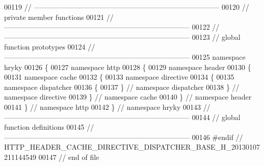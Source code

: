 \begin{DoxyCode}
00119 \textcolor{comment}{//
      ------------------------------------------------------------------------------}
00120 \textcolor{comment}{// private member functions}
00121 \textcolor{comment}{//
      ------------------------------------------------------------------------------}
00122 \textcolor{comment}{//
      ------------------------------------------------------------------------------}
00123 \textcolor{comment}{// global function prototypes}
00124 \textcolor{comment}{//
      ------------------------------------------------------------------------------}
00125 \textcolor{keyword}{namespace }hryky
00126 \{
00127 \textcolor{keyword}{namespace }http
00128 \{
00129 \textcolor{keyword}{namespace }header
00130 \{
00131 \textcolor{keyword}{namespace }cache
00132 \{
00133 \textcolor{keyword}{namespace }directive
00134 \{
00135 \textcolor{keyword}{namespace }dispatcher
00136 \{
00137 \} \textcolor{comment}{// namespace dispatcher}
00138 \} \textcolor{comment}{// namespace directive}
00139 \} \textcolor{comment}{// namespace cache}
00140 \} \textcolor{comment}{// namespace header}
00141 \} \textcolor{comment}{// namespace http}
00142 \} \textcolor{comment}{// namespace hryky}
00143 \textcolor{comment}{//
      ------------------------------------------------------------------------------}
00144 \textcolor{comment}{// global function definitions}
00145 \textcolor{comment}{//
      ------------------------------------------------------------------------------}
00146 \textcolor{preprocessor}{#endif // HTTP\_HEADER\_CACHE\_DIRECTIVE\_DISPATCHER\_BASE\_H\_20130107211144549}
00147 \textcolor{preprocessor}{}\textcolor{comment}{// end of file}
\end{DoxyCode}
